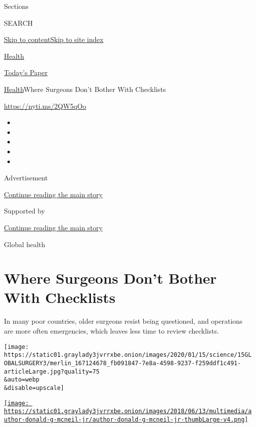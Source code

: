 Sections

SEARCH

\protect\hyperlink{site-content}{Skip to
content}\protect\hyperlink{site-index}{Skip to site index}

\href{https://www.nytimes3xbfgragh.onion/section/health}{Health}

\href{https://myaccount.nytimes3xbfgragh.onion/auth/login?response_type=cookie\&client_id=vi}{}

\href{https://www.nytimes3xbfgragh.onion/section/todayspaper}{Today's
Paper}

\href{/section/health}{Health}\textbar{}Where Surgeons Don't Bother With
Checklists

\url{https://nyti.ms/2QW5qOo}

\begin{itemize}
\item
\item
\item
\item
\item
\end{itemize}

Advertisement

\protect\hyperlink{after-top}{Continue reading the main story}

Supported by

\protect\hyperlink{after-sponsor}{Continue reading the main story}

Global health

\hypertarget{where-surgeons-dont-bother-with-checklists}{%
\section{Where Surgeons Don't Bother With
Checklists}\label{where-surgeons-dont-bother-with-checklists}}

In many poor countries, older surgeons resist being questioned, and
operations are more often emergencies, which leaves less time to review
checklists.

\texttt{[image: https://static01.graylady3jvrrxbe.onion/images/2020/01/15/science/15GLOBALSURGERY3/merlin\_167124678\_fb091847-7e8a-4598-9237-f259ddf1c491-articleLarge.jpg?quality=75\\\&auto=webp\\\&disable=upscale]}

\href{https://www.nytimes3xbfgragh.onion/by/donald-g-mcneil-jr}{\texttt{[image: https://static01.graylady3jvrrxbe.onion/images/2018/06/13/multimedia/author-donald-g-mcneil-jr/author-donald-g-mcneil-jr-thumbLarge-v4.png]}}

